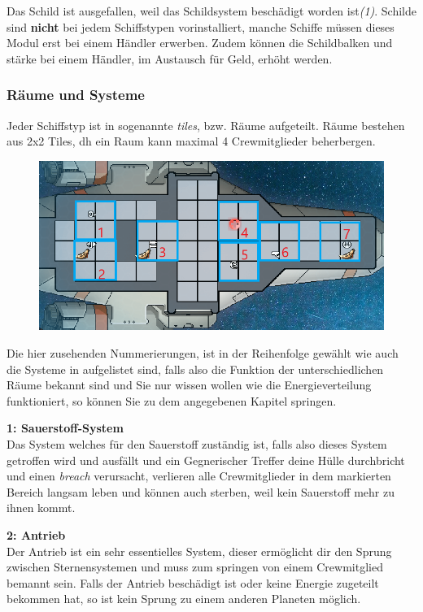 \documentclass[fontsize=12pt,paper=a4,twoside]{scrartcl}
\begin{document}
Das Schild ist ausgefallen, weil das Schildsystem beschädigt worden ist\textit{(1)}. Schilde sind \textbf{nicht} bei jedem Schiffstypen vorinstalliert, manche Schiffe müssen dieses Modul erst bei einem Händler erwerben. Zudem können die Schildbalken und stärke bei einem Händler, im Austausch für Geld, erhöht werden.  

\subsubsection{Räume und Systeme} 
\label{sec:Systeme}
Jeder Schiffstyp ist in sogenannte \textit{tiles}, bzw. Räume aufgeteilt. Räume bestehen aus 2x2 Tiles, dh ein Raum kann maximal 4 Crewmitglieder beherbergen.

\begin{figure}[H]
\centering
\includegraphics[width=1\linewidth]{DasSpiel/Ui/tiles.png}
\end{figure}

Die hier zusehenden Nummerierungen, ist in der Reihenfolge gewählt wie auch die Systeme in  aufgelistet sind, falls also die Funktion der unterschiedlichen Räume bekannt sind und Sie nur wissen wollen wie die Energieverteilung funktioniert, so können Sie zu dem angegebenen Kapitel springen.

\textbf{1: Sauerstoff-System}
\\
Das System welches für den Sauerstoff zuständig ist, falls also dieses System getroffen wird und ausfällt und ein Gegnerischer Treffer deine Hülle durchbricht und einen \textit{breach} verursacht, verlieren alle Crewmitglieder in dem markierten Bereich langsam leben und können auch sterben, weil kein Sauerstoff mehr zu ihnen kommt.

\textbf{2: Antrieb}
\\
Der Antrieb ist ein sehr essentielles System, dieser ermöglicht dir den Sprung zwischen Sternensystemen und muss zum springen von einem Crewmitglied bemannt sein. Falls der Antrieb beschädigt ist oder keine Energie zugeteilt bekommen hat, so ist kein Sprung zu einem anderen Planeten möglich.
\end{document}

